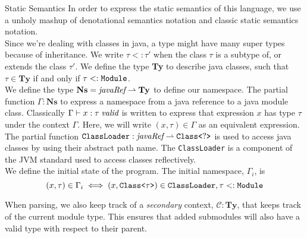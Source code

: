 \documentclass[11pt]{article}
\begin{document}
\begin{section}{Static Semantics}
In order to express the static semantics of this language, we use a unholy mashup of denotational semantics notation and classic static semantics notation.\\ 

Since we're dealing with classes in java, a type might have many super types because of inheritance. We write $\tau <: \tau'$ when the class $\tau$ is a subtype of, or extends the class $\tau'$. We define the type \textbf{Ty} to describe java classes, such that $\tau \in \textbf{Ty}$ if and only if $\tau <: \verb|Module|$.\\

We define the type $\textbf{Ns} = \emph{javaRef} \rightharpoonup \textbf{Ty}$ to define our namespace. The  partial function $\Gamma : \textbf{Ns}$ to express a namespace from a java reference to a java module class. Classically $\Gamma \vdash x : \tau\;\emph{valid}$ is written to express that expression $x$  has type $\tau$ under the context $\Gamma$. Here, we will write $(x, \tau) \in \Gamma$ as an equivalent expression.\\

The partial function $\verb|ClassLoader| : \emph{javaRef} \rightharpoonup \verb|Class<|?\verb|>|$ is used to access java classes by using their abstract path name. The \verb|ClassLoader| is a component of the JVM standard used to access classes reflectively. \\

We define the initial state of the program. The initial namespace, $\Gamma_i$, is 
\[(x, \tau) \in \Gamma_i \iff (x, \verb|Class<|\tau\verb|>|) \in \verb|ClassLoader|, \tau <: \verb|Module|\]

When parsing, we also keep track of a \emph{secondary} context, $\mathcal{C} : \textbf{Ty}$, that keeps track of the current module type. This ensures that added submodules will also have a valid type with respect to their parent.\\


\end{section}
\end{document}
